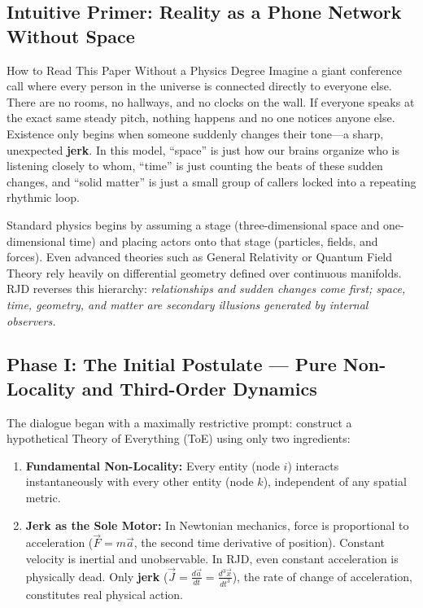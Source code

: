 \documentclass[11pt,a4paper]{article}
\theoremstyle{plain}
\theoremstyle{definition}
\theoremstyle{remark}
\begin{document}
\subsection{Intuitive Primer: Reality as a Phone Network Without Space}

\begin{noobbox}{How to Read This Paper Without a Physics Degree}
Imagine a giant conference call where every person in the universe is connected directly to everyone else. There are no rooms, no hallways, and no clocks on the wall. If everyone speaks at the exact same steady pitch, nothing happens and no one notices anyone else. Existence only begins when someone suddenly changes their tone---a sharp, unexpected \textbf{jerk}. In this model, ``space'' is just how our brains organize who is listening closely to whom, ``time'' is just counting the beats of these sudden changes, and ``solid matter'' is just a small group of callers locked into a repeating rhythmic loop.
\end{noobbox}

Standard physics begins by assuming a stage (three-dimensional space and one-dimensional time) and placing actors onto that stage (particles, fields, and forces). Even advanced theories such as General Relativity or Quantum Field Theory rely heavily on differential geometry defined over continuous manifolds. RJD reverses this hierarchy: \textit{relationships and sudden changes come first; space, time, geometry, and matter are secondary illusions generated by internal observers.}

\subsection{Phase I: The Initial Postulate — Pure Non-Locality and Third-Order Dynamics}

The dialogue began with a maximally restrictive prompt: construct a hypothetical Theory of Everything (ToE) using only two ingredients:
\begin{enumerate}
    \item \textbf{Fundamental Non-Locality:} Every entity (node $i$) interacts instantaneously with every other entity (node $k$), independent of any spatial metric.
    \item \textbf{Jerk as the Sole Motor:} In Newtonian mechanics, force is proportional to acceleration ($\vec{F} = m\vec{a}$, the second time derivative of position). Constant velocity is inertial and unobservable. In RJD, even constant acceleration is physically dead. Only \textbf{jerk} ($\vec{J} = \frac{d\vec{a}}{dt} = \frac{d^3\vec{x}}{dt^3}$), the rate of change of acceleration, constitutes real physical action.
\end{enumerate}
\end{document}
